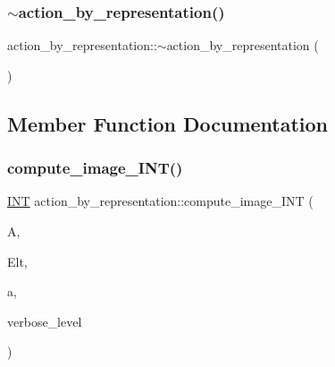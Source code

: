 \subsubsection{\texorpdfstring{$\sim$action\+\_\+by\+\_\+representation()}{~action\_by\_representation()}}
{\footnotesize\ttfamily action\+\_\+by\+\_\+representation\+::$\sim$action\+\_\+by\+\_\+representation (\begin{DoxyParamCaption}{ }\end{DoxyParamCaption})}



\subsection{Member Function Documentation}
\mbox{\label{classaction__by__representation_a8c6b43be13f3fa61c51d3c5f2a3411d4}} 
\subsubsection{\texorpdfstring{compute\+\_\+image\+\_\+\+I\+N\+T()}{compute\_image\_INT()}}
{\footnotesize\ttfamily \mbox{\hyperlink{galois_8h_a09fddde158a3a20bd2dcadb609de11dc}{I\+NT}} action\+\_\+by\+\_\+representation\+::compute\+\_\+image\+\_\+\+I\+NT (\begin{DoxyParamCaption}\item[{\mbox{\hyperlink{classaction}{action}} \&}]{A,  }\item[{\mbox{\hyperlink{galois_8h_a09fddde158a3a20bd2dcadb609de11dc}{I\+NT}} $\ast$}]{Elt,  }\item[{\mbox{\hyperlink{galois_8h_a09fddde158a3a20bd2dcadb609de11dc}{I\+NT}}}]{a,  }\item[{\mbox{\hyperlink{galois_8h_a09fddde158a3a20bd2dcadb609de11dc}{I\+NT}}}]{verbose\+\_\+level }\end{DoxyParamCaption})}

\mbox{\label{classaction__by__representation_a599c62e0318b6451dfe39af26d699baa}} 
